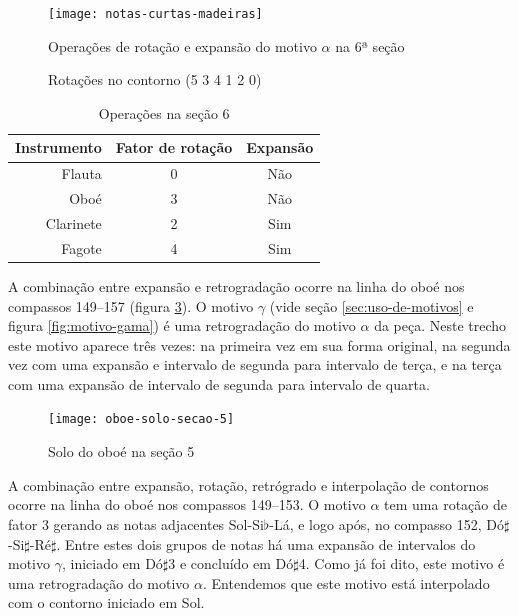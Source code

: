 \begin{figure}
  \centering
    \texttt{[image: notas-curtas-madeiras]}
    \caption{Operações de rotação e expansão do motivo $\alpha$ na 6ª
    seção}
  \label{fig:notas-curtas-madeiras}
\end{figure}

\begin{figure}
  \centering
  \subfloat[Rotação 2: (4 1 2 0 5 3)]{
    \texttt{[image: c-412053]}
    \label{fig:412053}  
  }
  \subfloat[Rotação 3: (1 2 0 5 3 4)]{
    \texttt{[image: c-120534]}
    \label{fig:120534}  
  }
  \subfloat[Rotação 4: (2 0 5 3 4 1)]{
    \texttt{[image: c-205341]}
    \label{fig:205341}  
  }
  \caption{Rotações no contorno (5 3 4 1 2 0)}
  \label{fig:rotacoes-534120}
\end{figure}

\begin{table}
  \centering
  \begin{tabular}{r|cc}
    Instrumento & Fator de rotação & Expansão \\
    \hline
    Flauta & 0 & Não \\
    Oboé & 3 & Não \\
    Clarinete & 2 & Sim \\
    Fagote & 4 & Sim \\
  \end{tabular}
  \caption{Operações na seção 6}
  \label{tab:operacoes-secao-6}
\end{table}

A combinação entre expansão e retrogradação ocorre na linha do oboé
nos compassos 149--157 (figura \ref{fig:oboe-solo-secao-5}). O motivo
$\gamma$ (vide seção \ref{sec:uso-de-motivos} e figura
\ref{fig:motivo-gama}) é uma retrogradação do motivo $\alpha$ da
peça. Neste trecho este motivo aparece três vezes: na primeira vez em
sua forma original, na segunda vez com uma expansão e intervalo de
segunda para intervalo de terça, e na terça com uma expansão de
intervalo de segunda para intervalo de quarta.

\begin{figure}
  \centering
  \texttt{[image: oboe-solo-secao-5]}
  \caption{Solo do oboé na seção 5}
  \label{fig:oboe-solo-secao-5}
\end{figure}

A combinação entre expansão, rotação, retrógrado e interpolação de
contornos ocorre na linha do oboé nos compassos 149--153. O motivo
$\alpha$ tem uma rotação de fator 3 gerando as notas adjacentes
Sol-Si$\flat$-Lá, e logo após, no compasso 152,
Dó$\sharp$-Si$\sharp$-Ré$\sharp$. Entre estes dois grupos de notas há
uma expansão de intervalos do motivo $\gamma$, iniciado em Dó$\sharp$3
e concluído em Dó$\sharp$4. Como já foi dito, este motivo é uma
retrogradação do motivo $\alpha$. Entendemos que este motivo está
interpolado com o contorno iniciado em Sol.

